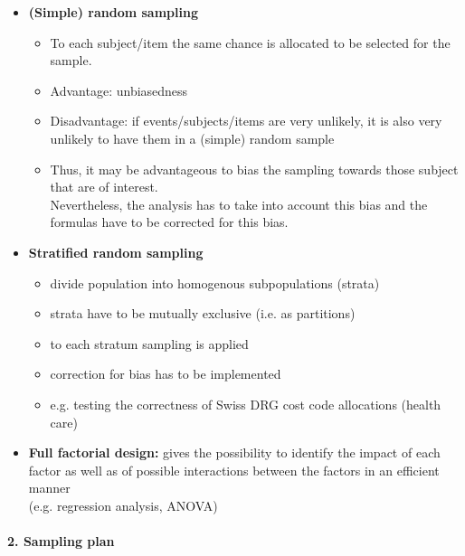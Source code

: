 \documentclass[a4paper, landscape, 6pt, fleqn]{scrartcl}
\renewcommand{\emph}[1]{\textbf{#1}}
\begin{document}
\begin{multicols*}{4}
\begin{itemize}
\item \emph{(Simple) random sampling}
\begin{itemize}
\item To each subject/item the same chance is allocated to be selected for the sample.
\item Advantage: unbiasedness
\item Disadvantage: if events/subjects/items are very unlikely, it is also very unlikely to have them in a (simple) random sample
\item Thus, it may be advantageous to bias the sampling towards those subject that are of interest. \\
Nevertheless, the analysis has to take into account this bias and the formulas have to be corrected for this bias.
\end{itemize}
\item \emph{Stratified random sampling}
\begin{itemize}
\item divide population into homogenous subpopulations (strata)
\item strata have to be mutually exclusive (i.e. as partitions)
\item to each stratum sampling is applied
\item correction for bias has to be implemented
\item e.g. testing the correctness of Swiss DRG cost code allocations (health care)
\end{itemize}
\item \emph{Full factorial design:} gives the possibility to identify the impact of each factor as well as of possible interactions between the factors in an efficient manner \\
(e.g. regression analysis, ANOVA)
\end{itemize}

\paragraph{2. Sampling plan}


\end{multicols*}
\end{document}

